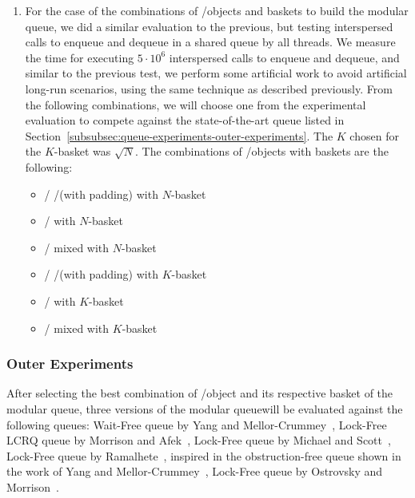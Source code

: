 \begin{enumerate}
  \item For the case of the combinations of \LL/\IC objects and baskets to build the modular queue, we did a similar evaluation to the previous, but testing interspersed calls to enqueue and dequeue in a shared queue by all threads. We measure the time for executing \(5\cdot 10^6\) interspersed calls to enqueue and dequeue, and similar to the previous test, we perform some artificial work to avoid artificial long-run scenarios, using the same technique as described previously. From the following combinations, we will choose one from the experimental evaluation to compete against the state-of-the-art queue listed in Section~\ref{subsubsec:queue-experiments-outer-experiments}. The \(K\) chosen for the \(K\)-basket was \(\sqrt{N}\). The combinations of \LL/\IC objects with baskets are the following:
    \begin{itemize}
        \item \LL/\IC{} \R/\W (with padding) with \(N\)-basket
        \item \LL/\IC{} \CAS with \(N\)-basket
        \item \LL/\IC{} mixed with \(N\)-basket
        \item \LL/\IC{} \R/\W (with padding) with \(K\)-basket
        \item \LL/\IC{} \CAS with \(K\)-basket
        \item \LL/\IC{} mixed with \(K\)-basket
    \end{itemize}
\end{enumerate}



\subsubsection{\label{subsubsec:queue-experiments-outer-experiments}Outer Experiments}

After selecting the best combination of \LL/\IC object and its respective basket of the modular queue, three versions of the modular queuewill be evaluated against the following queues: Wait-Free queue by Yang and Mellor-Crummey~\cite{DBLP_conf_ppopp_YangM16},  Lock-Free LCRQ queue by Morrison and Afek~\cite{ppopp2013x86queues}, Lock-Free queue by Michael and Scott~\cite{DBLP_conf_podc_MichaelS96}, Lock-Free queue by Ramalhete~\cite{Ramalhete_Correia_MPMC_2016}, inspired in the obstruction-free queue shown in the work of Yang and Mellor-Crummey~\cite{DBLP_conf_ppopp_YangM16}, Lock-Free queue by Ostrovsky and Morrison~\cite{scalingconcurrent2020}.

